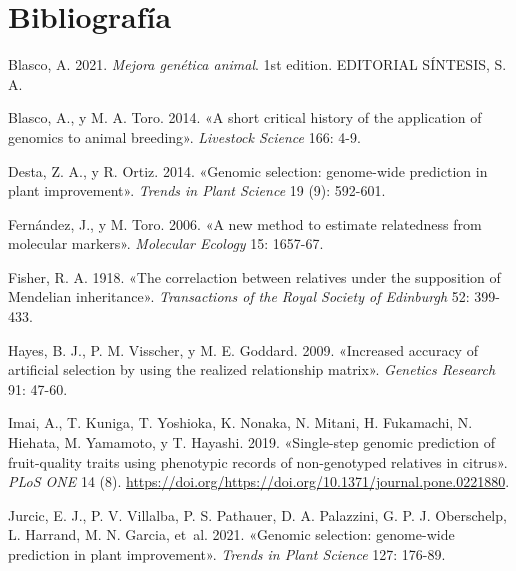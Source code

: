 \documentclass[11pt,spanish,a4paper,oneside,]{book} %
\begin{document}
\backmatter

\hypertarget{bibliografuxeda}{%
\chapter*{Bibliografía}\label{bibliografuxeda}}

\begingroup
\hspace{\parindent}
\setlength{\parindent}{-0.25in}
\setlength{\leftskip}{0.25in}
\setlength{\parskip}{0pt}

\hypertarget{refs}{}
\leavevmode\hypertarget{ref-cite:21}{}%
Blasco, A. 2021. \emph{Mejora genética animal}. 1st edition. EDITORIAL SÍNTESIS, S. A.

\leavevmode\hypertarget{ref-cite:3}{}%
Blasco, A., y M. A. Toro. 2014. «A short critical history of the application of genomics to animal breeding». \emph{Livestock Science} 166: 4-9.

\leavevmode\hypertarget{ref-cite:10}{}%
Desta, Z. A., y R. Ortiz. 2014. «Genomic selection: genome-wide prediction in plant improvement». \emph{Trends in Plant Science} 19 (9): 592-601.

\leavevmode\hypertarget{ref-cite:24}{}%
Fernández, J., y M. Toro. 2006. «A new method to estimate relatedness from molecular markers». \emph{Molecular Ecology} 15: 1657-67.

\leavevmode\hypertarget{ref-cite:1}{}%
Fisher, R. A. 1918. «The correlaction between relatives under the supposition of Mendelian inheritance». \emph{Transactions of the Royal Society of Edinburgh} 52: 399-433.

\leavevmode\hypertarget{ref-cite:13}{}%
Hayes, B. J., P. M. Visscher, y M. E. Goddard. 2009. «Increased accuracy of artificial selection by using the realized relationship matrix». \emph{Genetics Research} 91: 47-60.

\leavevmode\hypertarget{ref-cite:20}{}%
Imai, A., T. Kuniga, T. Yoshioka, K. Nonaka, N. Mitani, H. Fukamachi, N. Hiehata, M. Yamamoto, y T. Hayashi. 2019. «Single-step genomic prediction of fruit-quality traits using phenotypic records of non-genotyped relatives in citrus». \emph{PLoS ONE} 14 (8). \url{https://doi.org/https://doi.org/10.1371/journal.pone.0221880}.

\leavevmode\hypertarget{ref-cite:11}{}%
Jurcic, E. J., P. V. Villalba, P. S. Pathauer, D. A. Palazzini, G. P. J. Oberschelp, L. Harrand, M. N. Garcia, et~al. 2021. «Genomic selection: genome-wide prediction in plant improvement». \emph{Trends in Plant Science} 127: 176-89.
\end{document}
